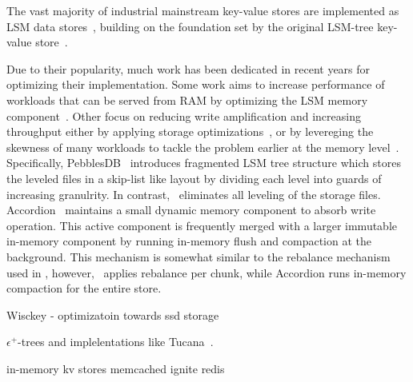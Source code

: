 

The vast majority of industrial mainstream key-value stores are  implemented as LSM data
stores~\cite{Bigtable2008,hbase,cassandra2010,RocksDB, scylladb}, building on the foundation set by the original LSM-tree key-value store~\cite{O'Neil1996, Muth1998}.

Due to their popularity, much work has been dedicated in recent years for optimizing their implementation. Some work aims to increase performance of workloads that can be served from 
RAM by optimizing the LSM memory component~\cite{clsm2015, accordion}. Other focus on reducing write amplification and increasing throughput either by applying storage optimizations~\cite{WiscKey, PebblesDB}, or by levereging the skewness of many workloads to tackle the problem earlier at the memory level~\cite{ accordion, triad}.
Specifically, PebblesDB~\cite{PebblesDB} introduces fragmented LSM tree structure which stores the leveled files in a skip-list like layout by dividing each level into guards of increasing granulrity. In contrast, \sys\ eliminates all leveling of the storage files. 
Accordion~\cite{accordion} maintains a small dynamic memory component to absorb write operation. This active component is frequently merged with a larger immutable in-memory component by running in-memory flush and compaction at the background. This mechanism is somewhat similar to the rebalance mechanism used in \sys, however, \sys\ applies rebalance per chunk, while Accordion runs in-memory compaction for the entire store.



Wisckey - optimizatoin towards ssd storage

$\epsilon^+$-trees and implelentations like Tucana~\cite{tucana}.

in-memory kv stores memcached ignite redis